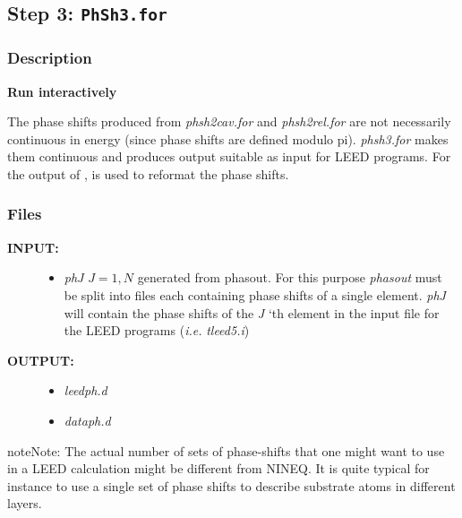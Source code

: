 \documentclass[letterpaper,10pt,english]{sphinxmanual}
\begin{document}
\subsection{Step 3: \texttt{PhSh3.for}}
\label{phshift2007:step-3-phsh3-for}

\subsubsection{Description}
\label{phshift2007:id5}
\textbf{Run interactively}

The phase shifts produced from \emph{phsh2cav.for} and \emph{phsh2rel.for}
are not necessarily continuous in energy (since phase
shifts are defined modulo pi). \emph{phsh3.for} makes them continuous
and produces output suitable as input for LEED programs.
For the output of ,  is used to reformat
the phase shifts.


\subsubsection{Files}
\label{phshift2007:id6}\begin{description}
\item[{\textbf{INPUT:}}] \leavevmode\begin{itemize}
\item {} 
\emph{phJ} \(J = 1, N\)  generated from phasout. For this purpose
\emph{phasout} must be split into files each containing
phase shifts of a single element. \emph{phJ} will contain
the phase shifts of the \emph{J} `th element in the
input file for the LEED programs (\emph{i.e.} \emph{tleed5.i})

\end{itemize}

\item[{\textbf{OUTPUT:}}] \leavevmode\begin{itemize}
\item {} 
\emph{leedph.d}

\item {} 
\emph{dataph.d}

\end{itemize}

\end{description}

\begin{notice}{note}{Note:}
The actual number of sets of phase-shifts that one might
want to use in a LEED calculation might be different
from NINEQ. It is quite typical for instance to use a
single set of phase shifts to describe substrate atoms
in different layers.
\end{notice}
\end{document}
